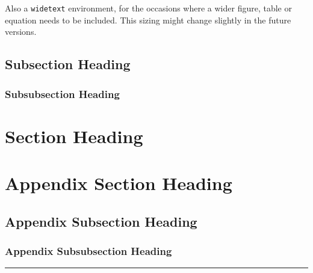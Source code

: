 \documentclass{penrose}
\begin{document}
Also a \texttt{widetext} environment, for the occasions where a wider figure, table or equation needs to be included. This sizing might change slightly in the future versions.
\begin{widetext}
  \lipsum[33]
\end{widetext}

\subsection{Subsection Heading}
\lipsum[21]

  \subsubsection{Subsubsection Heading}
  \lipsum[22]

\section{Section Heading}
\lipsum[13]


\appendix
\section{Appendix Section Heading}
\lipsum[11]

\subsection{Appendix Subsection Heading}
\lipsum[12]

  \subsubsection{Appendix Subsubsection Heading}
  \lipsum[13]

\begin{center}
  \vspace*{0.5em}
  \rule{0.8\textwidth}{0.8pt}
\end{center}

\nocite{*}
{\small }
\end{document}
